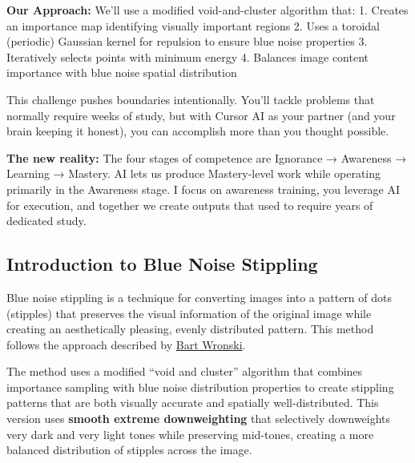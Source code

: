 \documentclass[
  letterpaper,
  DIV=11,
  numbers=noendperiod]{scrartcl}
\begin{document}
\textbf{Our Approach:} We'll use a modified void-and-cluster algorithm
that: 1. Creates an importance map identifying visually important
regions 2. Uses a toroidal (periodic) Gaussian kernel for repulsion to
ensure blue noise properties 3. Iteratively selects points with minimum
energy 4. Balances image content importance with blue noise spatial
distribution

\begin{tcolorbox}[enhanced jigsaw, arc=.35mm, colback=white, opacitybacktitle=0.6, rightrule=.15mm, leftrule=.75mm, title=\textcolor{quarto-callout-warning-color}{\faExclamationTriangle}\hspace{0.5em}{⚠️ AI Partnership Required}, toptitle=1mm, toprule=.15mm, left=2mm, titlerule=0mm, coltitle=black, bottomtitle=1mm, opacityback=0, colframe=quarto-callout-warning-color-frame, breakable, bottomrule=.15mm, colbacktitle=quarto-callout-warning-color!10!white]

This challenge pushes boundaries intentionally. You'll tackle problems
that normally require weeks of study, but with Cursor AI as your partner
(and your brain keeping it honest), you can accomplish more than you
thought possible.

\textbf{The new reality:} The four stages of competence are Ignorance →
Awareness → Learning → Mastery. AI lets us produce Mastery-level work
while operating primarily in the Awareness stage. I focus on awareness
training, you leverage AI for execution, and together we create outputs
that used to require years of dedicated study.

\end{tcolorbox}

\subsection{Introduction to Blue Noise
Stippling}\label{introduction-to-blue-noise-stippling}

Blue noise stippling is a technique for converting images into a pattern
of dots (stipples) that preserves the visual information of the original
image while creating an aesthetically pleasing, evenly distributed
pattern. This method follows the approach described by
\href{https://bartwronski.com/2022/08/31/progressive-image-stippling-and-greedy-blue-noise-importance-sampling/}{Bart
Wronski}.

The method uses a modified ``void and cluster'' algorithm that combines
importance sampling with blue noise distribution properties to create
stippling patterns that are both visually accurate and spatially
well-distributed. This version uses \textbf{smooth extreme
downweighting} that selectively downweights very dark and very light
tones while preserving mid-tones, creating a more balanced distribution
of stipples across the image.
\end{document}
